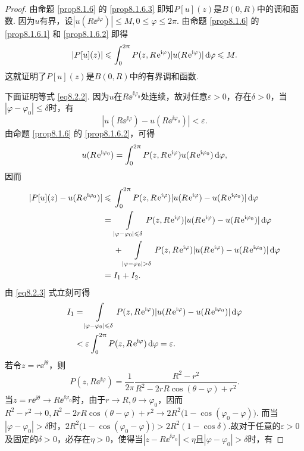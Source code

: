 \begin{proof}
  由命题 \ref{prop8.1.6} 的 \ref{prop8.1.6.3} 即知$P[u](z)$是$B(0,R)$中的调和函数. 因为$u$有界，设$|u(R\ee^{\ii\varphi})|\le M,0\le\varphi\le2\pi$. 由命题 \ref{prop8.1.6} 的 \ref{prop8.1.6.1} 和 \ref{prop8.1.6.2} 即得
  \[
    |P[u](z)| \leqslant \int_0^{2\uppi}P(z,R\operatorname{\!\!\;\mathrm e}^{\mathrm i\varphi})|u(R\operatorname{\!\!\;\mathrm e}^{\mathrm i\varphi})|\mathop{}\!\mathrm{d} \varphi\leqslant M.
  \]
  这就证明了$P[u](z)$是$B(0,R)$中的有界调和函数.

  下面证明等式 \eqref{eq8.2.2}. 因为$u$在$R\ee^{\ii\varphi_0}$处连续，故对任意$\varepsilon>0$，存在$\delta>0$，当$|\varphi-\varphi_0|\le\delta$时，有
  \begin{equation}\label{eq8.2.3}
    |u(R\ee^{\ii\varphi}) - u(R\ee^{\ii\varphi_0})| < \varepsilon.
  \end{equation}
  由命题 \ref{prop8.1.6} 的 \ref{prop8.1.6.2}，可得
  \[
    u(R\operatorname{\!\!\;\mathrm e}^{\mathrm i\varphi_0}) = \int_0^{2\uppi}P(z,R\operatorname{\!\!\;\mathrm e}^{\mathrm i\varphi})u(R\operatorname{\!\!\;\mathrm e}^{\mathrm i\varphi_0})
    \mathop{}\!\mathrm{d} \varphi,
  \]
  因而
  \begin{align*}
    |P[u](z)-u(R\ee^{\ii\varphi_0})| \le {} & \int_0^{2\pi}P(z,R\ee^{\ii\varphi})|u(R\ee^{\ii\varphi})-u(R\ee^{\ii\varphi_0})|
    \dif \varphi\\
    = {} & \int\limits_{|\varphi-\varphi_0|\le\delta}P(z,R\ee^{\ii\varphi})|u(R\ee^{\ii\varphi})
        -u(R\ee^{\ii\varphi_0})|\dif \varphi\\
    & + \int\limits_{|\varphi-\varphi_0|>\delta}P(z,R\ee^{\ii\varphi})|u(R\ee^{\ii\varphi})
      - u(R\ee^{\ii\varphi_0})|\dif \varphi\\
    = {}& I_1 + I_2.
  \end{align*}
  由 \eqref{eq8.2.3} 式立刻可得
  \begin{equation}\label{eq8.2.4}
    \begin{aligned}
      I_1 & = \int\limits_{|\varphi-\varphi_0|\le\delta}P(z,R\ee^{\ii\varphi})|u(R\ee^{\ii\varphi})
      - u(R\ee^{\ii\varphi_0})|\dif \varphi\\
      & < \varepsilon\int_0^{2\pi}P(z,R\ee^{\ii\varphi})\dif \varphi=\varepsilon.
    \end{aligned}
  \end{equation}
  若令$z=r\ee^{\ii\theta}$，则
  \[
    P(z,R\ee^{\ii\varphi}) = \frac1{2\pi}\frac{R^2-r^2}{R^2-2rR\cos(\theta-\varphi)+r^2}.
  \]
  当$z=r\ee^{\ii\theta}\to R\ee^{\ii\varphi_0}$时，由于$r\to R,\theta\to\varphi_0$，因而$R^2-r^2\to0,R^2-2rR\cos(\theta-\varphi)+r^2\to2R^2\big(1-\cos(\varphi_0-\varphi)\big)$. 而当$|\varphi-\varphi_0|>\delta$时，$2R^2\big(1-\cos(\varphi_0-\varphi)\big)>2R^2(1-\cos\delta)$.故对于任意的$\varepsilon>0$及固定的$\delta>0$，必存在$\eta>0$，使得当$|z-R\ee^{\ii\varphi_0}|<\eta$且$|\varphi-\varphi_0|>\delta$时，有

\end{proof}
